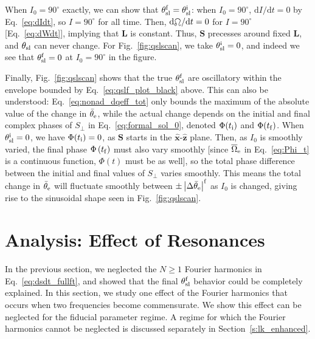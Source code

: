 \documentclass[
        twocolumn,
        twocolappendix
    ]{aastex63}
\newcommand*{\rdil}[2]{\mathrm{d}#1 / \mathrm{d}#2}
\newcommand*{\abs}[1]{\left|#1\right|}
\renewcommand*{\bm}[1]{\boldsymbol{\mathbf{#1}}}
\newcommand*{\uv}[1]{\hat{\bm{#1}}}
\newcommand*{\p}[1]{\left(#1\right)}
\begin{document}
When $I_0 = 90^\circ$ exactly, we can show that $\theta_{\rm sl}^{\rm f} =
\theta_{\rm sl}^{\rm i}$: when $I_0 = 90^\circ$, $\rdil{I}{t} = 0$ by
Eq.~\eqref{eq:dIdt}, so $I = 90^\circ$ for all time. Then, $\rdil{\ascnode}{t} =
0$ for $I = 90^\circ$ [Eq.~\eqref{eq:dWdt}], implying that $\bm{L}$ is constant.
Thus, $\bm{S}$ precesses around fixed $\bm{L}$, and $\theta_{\rm sl}$ can never
change. For Fig.~\ref{fig:qslscan}, we take $\theta_{\rm sl}^{\rm i} = 0$, and
indeed we see that $\theta_{\rm sl}^{\rm f} = 0$ at $I_0 = 90^\circ$ in the
figure.

Finally, Fig.~\ref{fig:qslscan} shows that the true $\theta_{\rm sl}^{\rm f}$
are oscillatory within the envelope bounded by Eq.~\eqref{eq:qslf_plot_black}
above. This can also be understood: Eq.~\eqref{eq:nonad_dqeff_tot} only bounds
the maximum of the absolute value of the change in $\bar{\theta}_{\rm e}$, while
the actual change depends on the initial and final complex phases of $S_{\perp}$
in Eq.~\eqref{eq:formal_sol_0}, denoted $\Phi(t_{\rm i})$ and $\Phi(t_{\rm f})$.
When $\theta_{\rm sl}^{\rm i} = 0$, we have $\Phi(t_{\rm i}) = 0$, as $\bm{S}$
starts in the $\uv{x}$-$\uv{z}$ plane. Then, as $I_0$ is smoothly varied, the
final phase $\Phi\p{t_{\rm f}}$ must also vary smoothly [since
$\overline{\Omega}_{\rm e}$ in Eq.~\eqref{eq:Phi_t} is a continuous function,
$\Phi\p{t}$ must be as well], so the total phase difference between the initial
and final values of $S_{\perp}$ varies smoothly. This means the total change in
$\bar{\theta}_{\rm e}$ will fluctuate smoothly between $\pm \abs{\Delta
\bar{\theta}_{\rm e}}^{\rm f}$ as $I_0$ is changed, giving rise to the
sinusoidal shape seen in Fig.~\ref{fig:qslscan}.

%

\section{Analysis: Effect of Resonances}\label{s:harmonic}

In the previous section, we neglected the $N \geq 1$ Fourier harmonics in
Eq.~\eqref{eq:dsdt_fullft}, and showed that the final $\theta_{\rm sl}^{\rm f}$
behavior could be completely explained. In this section, we study one effect of
the Fourier harmonics that occurs when two frequencies become commensurate. We
show this effect can be neglected for the fiducial parameter regime. A regime
for which the Fourier harmonics cannot be neglected is discussed separately in
Section~\ref{s:lk_enhanced}.
\end{document}
